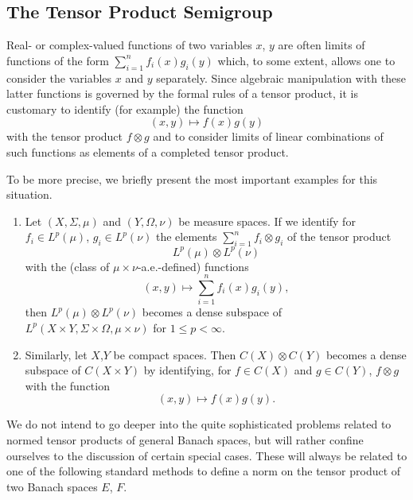 \subsection{The Tensor Product Semigroup}\label{subsec:a1-3.8}

Real- or complex-valued functions of two variables $x$, $y$ are often limits of functions of the form $\sum_{i=1}^{n} f_{i}(x)g_{i}(y)$ which, to some extent, allows one to consider the variables $x$ and $y$ separately.
Since algebraic manipulation with these latter functions is governed by the formal rules of a tensor product, it is customary to identify (for example) the function
\[
    (x,y) \mapsto f(x)g(y)
\]
with the tensor product $f \otimes g$ and to consider limits of linear combinations of such functions as elements of a completed tensor product.

To be more precise, we briefly present the most important examples for this situation.
\begin{examples*}\label{ex:a1-5.1}
\begin{enumerate}[\upshape(i), wide, labelindent=.5em]

\item
Let $(X,\Sigma,\mu)$ and $(Y,\Omega,\nu)$ be measure spaces. 
If we identify for $f_{i} \in L^{p}(\mu)$, $g_{i} \in L^{p}(\nu)$ the elements $\sum_{i=1}^{n} f_{i} \otimes g_{i}$ of the tensor product
\[
    L^{p}(\mu) \otimes L^{p}(\nu)
\]
with the (class of $\mu \times \nu$-a.e.-defined) functions
\[
    (x,y) \mapsto \sum_{i=1}^{n} f_{i}(x)g_{i}(y) ,
\]
then $L^{p}(\mu) \otimes L^{p}(\nu)$ becomes a dense subspace of $L^{p}(X\times Y,\Sigma\times\Omega,\mu\times\nu)$ for $1 \leq p < \infty$.

\item
Similarly, let $X$,$Y$ be compact spaces. Then $C(X) \otimes C(Y)$ becomes a dense subspace of $C(X\times Y)$ by identifying, for $f \in C(X)$ and $g \in C(Y)$, $f \otimes g$ with the function
\[
    (x,y) \mapsto f(x)g(y) .
\]
\end{enumerate}
\end{examples*}
We do not intend to go deeper into the quite sophisticated problems related to normed tensor products of general Banach spaces, but will rather confine ourselves to the discussion of certain special cases.
These will always be related to one of the following standard methods to define a norm on the tensor product of two Banach spaces $E$, $F$.

